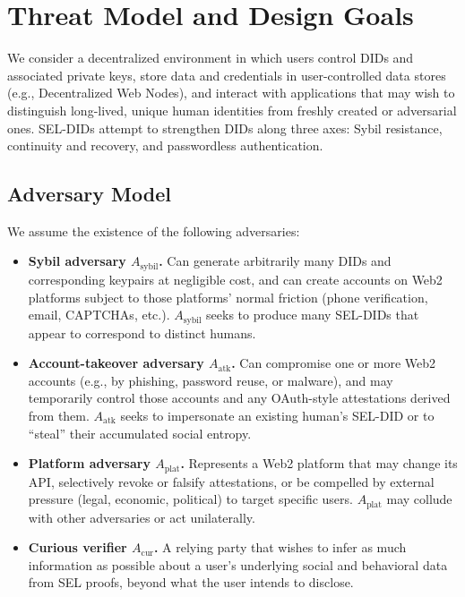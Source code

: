 \documentclass[11pt]{article}
\begin{document}
\section{Threat Model and Design Goals}
\label{sec:threat}

We consider a decentralized environment in which users control DIDs and associated private keys, store data and credentials in user-controlled data stores (e.g., Decentralized Web Nodes), and interact with applications that may wish to distinguish long-lived, unique human identities from freshly created or adversarial ones. SEL-DIDs attempt to strengthen DIDs along three axes: Sybil resistance, continuity and recovery, and passwordless authentication.

\subsection{Adversary Model}

We assume the existence of the following adversaries:

\begin{itemize}
  \item \textbf{Sybil adversary $A_{\text{sybil}}$.} Can generate arbitrarily many DIDs and corresponding keypairs at negligible cost, and can create accounts on Web2 platforms subject to those platforms' normal friction (phone verification, email, CAPTCHAs, etc.). $A_{\text{sybil}}$ seeks to produce many SEL-DIDs that appear to correspond to distinct humans.
  \item \textbf{Account-takeover adversary $A_{\text{atk}}$.} Can compromise one or more Web2 accounts (e.g., by phishing, password reuse, or malware), and may temporarily control those accounts and any OAuth-style attestations derived from them. $A_{\text{atk}}$ seeks to impersonate an existing human's SEL-DID or to ``steal'' their accumulated social entropy.
  \item \textbf{Platform adversary $A_{\text{plat}}$.} Represents a Web2 platform that may change its API, selectively revoke or falsify attestations, or be compelled by external pressure (legal, economic, political) to target specific users. $A_{\text{plat}}$ may collude with other adversaries or act unilaterally.
  \item \textbf{Curious verifier $A_{\text{cur}}$.} A relying party that wishes to infer as much information as possible about a user's underlying social and behavioral data from SEL proofs, beyond what the user intends to disclose.
\end{itemize}
\end{document}
